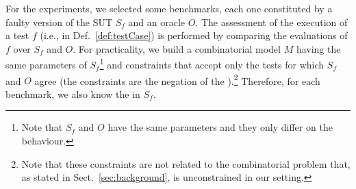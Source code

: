 \begin{tikzborder}{\cite{Gargantini16:validation}}
\begin{tikzborder}{\cite{gargantini_combinatorial_2017}}
\begin{tikzborder}{\cite{gargantini_combinatorial_2017}}
\begin{tikzborder}{\cite{garn2019}}
\begin{tikzborder}{\cite{arcaini2019achieving}}
\begin{tikzborder}{}
For the experiments, we selected some benchmarks, each one constituted by a faulty version of the SUT $S_f$ and an oracle $O$. The assessment of the execution of a test $f$ (i.e., \result in Def.~\ref{def:testCase}) is performed by comparing the evaluations of $f$ over $S_f$ and $O$. For practicality, we build a combinatorial model $M$ having the same parameters of $S_f$\footnote{Note that $S_f$ and $O$ have the same parameters and they only differ on the behaviour.} and constraints that accept only the tests for which $S_f$ and $O$ agree (the constraints are the negation of the \truemfics).\footnote{Note that these constraints are not related to the combinatorial problem that, as stated in Sect.~\ref{sec:background}, is unconstrained in our setting.} Therefore, for each benchmark, we also know the \truemfics in $S_f$.


\end{tikzborder}
\end{tikzborder}
\end{tikzborder}
\end{tikzborder}
\end{tikzborder}
\end{tikzborder}
